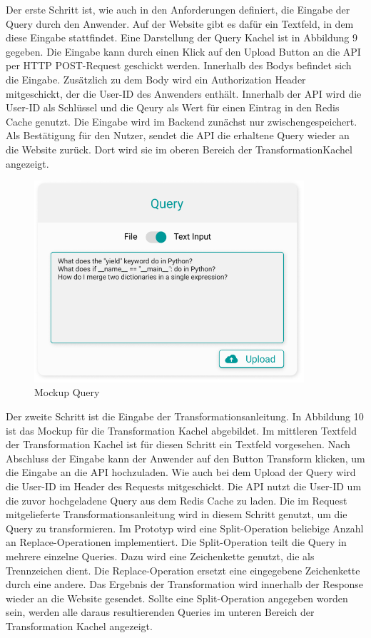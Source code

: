 Der erste Schritt ist, wie auch in den Anforderungen definiert, die Eingabe der Query durch den Anwender. Auf der Website gibt es dafür ein Textfeld, in dem diese Eingabe stattfindet. Eine Darstellung der \glqq Query\grqq{} Kachel ist in Abbildung 9 gegeben. Die Eingabe kann durch einen Klick auf den \glqq Upload\grqq{} Button an die API per HTTP POST-Request geschickt werden. Innerhalb des Bodys befindet sich die Eingabe. Zusätzlich zu dem Body wird ein Authorization Header mitgeschickt, der die User-ID des Anwenders enthält. Innerhalb der API wird die User-ID als Schlüssel und die Qeury als Wert für einen Eintrag in den Redis Cache genutzt. Die Eingabe wird im Backend zunächst nur zwischengespeichert. Als Bestätigung für den Nutzer, sendet die API die erhaltene Query wieder an die Website zurück. Dort wird sie im oberen Bereich der \glqq Transformation\grqq Kachel angezeigt. 

\begin{figure}[H]
  \centering
    \includegraphics[width = 10cm]{bilder/mockupQuery}
    \caption{Mockup Query}
\end{figure}

Der zweite Schritt ist die Eingabe der Transformationsanleitung. In Abbildung 10 ist das Mockup für die \glqq Transformation\grqq{} Kachel abgebildet. Im mittleren Textfeld der \glqq Transformation\grqq{} Kachel ist für diesen Schritt ein Textfeld vorgesehen. Nach Abschluss der Eingabe kann der Anwender auf den Button \glqq Transform\grqq{} klicken, um die Eingabe an die API hochzuladen. Wie auch bei dem Upload der Query wird die User-ID im Header des Requests mitgeschickt. Die API nutzt die User-ID um die zuvor hochgeladene Query aus dem Redis Cache zu laden. Die im Request mitgelieferte Transformationsanleitung wird in diesem Schritt genutzt, um die Query zu transformieren. Im Prototyp wird eine Split-Operation beliebige Anzahl an Replace-Operationen implementiert. Die Split-Operation teilt die Query in mehrere einzelne Queries. Dazu wird eine Zeichenkette genutzt, die als Trennzeichen dient. Die Replace-Operation ersetzt eine eingegebene Zeichenkette durch eine andere. Das Ergebnis der Transformation wird innerhalb der Response wieder an die Website gesendet. Sollte eine Split-Operation angegeben worden sein, werden alle daraus resultierenden Queries im unteren Bereich der \glqq Transformation\grqq{} Kachel angezeigt. 


